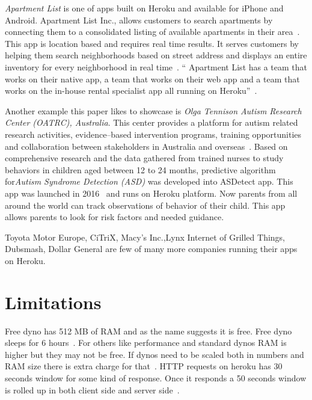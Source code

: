  \textit{Apartment List} is one of apps built on Heroku and available for iPhone and
 Android. Apartment List Inc., allows customers to search apartments by
 connecting them to a consolidated listing of available apartments in
 their area~\cite{hid-sp18-415-www-customers-heroku-com}. This app is location based
 and requires real time results. It serves customers by helping them search
 neighborhoods based on street address and displays an entire inventory for
 every neighborhood in real time~\cite{hid-sp18-415-www-customers-heroku-com}.
 `` Apartment List has a team that works on their native app, a team
 that works on their web app and a team that works on the in-house rental
 specialist app  all running on Heroku''~\cite{hid-sp18-415-www-customers-heroku-com}.

 Another example this paper likes to showcase is \textit{Olga Tennison 
 Autism Research Center (OATRC), Australia}. This center provides a
 platform for autism related research activities, evidence--based
 intervention programs, training opportunities and collaboration
 between stakeholders in Australia and
 overseas~\cite{hid-sp18-415-www-customers-heroku-com}. Based on
 comprehensive research and the data gathered from trained nurses
 to study behaviors in children aged between 12 to 24 months, predictive
 algorithm for\textit{Autism Syndrome Detection (ASD)}
 was developed into ASDetect app. This app was launched in 
 2016~\cite{hid-sp18-415-www-customers-heroku-com} and runs on Heroku platform.
 Now parents
 from all around the world can track observations of behavior of their child.
 This app allows parents to look for risk factors and needed guidance.

 Toyota Motor Europe, CiTriX, Macy's Inc.,Lynx Internet of Grilled Things,
 Dubsmash, Dollar General are few of many more companies running their apps
 on Heroku.


\section{Limitations}

 Free dyno has 512 MB of RAM and as the name suggests it is free. Free dyno
 sleeps for 6 hours~\cite{hid-sp18-415-www-how-heroku-works}. For others like performance
 and standard dynos RAM is higher but they may not be free. If dynos need to
 be scaled both in numbers and RAM size there is extra charge for
 that~\cite{hid-sp18-415-www-how-heroku-works}. HTTP requests on heroku has 30 seconds
 window for some kind of response. Once it responds a 50 seconds window is
 rolled up in both client side and server side~\cite{hid-sp18-415-www-devcenter-herokulimits}.

